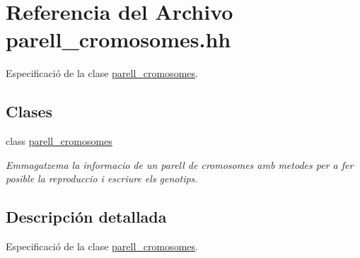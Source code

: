 \hypertarget{parell__cromosomes_8hh}{}\section{Referencia del Archivo parell\+\_\+cromosomes.\+hh}
\label{parell__cromosomes_8hh}


Especificació de la clase \hyperlink{classparell__cromosomes}{parell\+\_\+cromosomes}.  


\subsection*{Clases}
\begin{DoxyCompactItemize}
\item 
class \hyperlink{classparell__cromosomes}{parell\+\_\+cromosomes}
\begin{DoxyCompactList}\small\item\em Emmagatzema la informacio de un parell de cromosomes amb metodes per a fer posible la reproduccio i escriure els genotips. \end{DoxyCompactList}\end{DoxyCompactItemize}


\subsection{Descripción detallada}
Especificació de la clase \hyperlink{classparell__cromosomes}{parell\+\_\+cromosomes}. 

